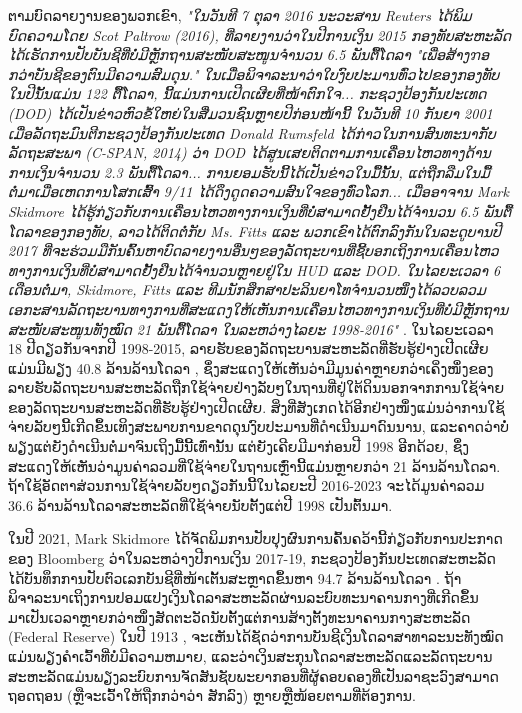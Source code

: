 \documentclass[10pt,twocolumn,letterpaper]{article}
\begin{document}
ຕາມບົດລາຍງານຂອງພວກເຂົາ, \textit{"ໃນວັນທີ 7 ຕຸລາ 2016 ນະວະສານ Reuters ໄດ້ພິມບົດຄວາມໂດຍ Scot Paltrow (2016), ທີ່ລາຍງານວ່າໃນປີການເງິນ 2015 ກອງທັບສະຫະລັດໄດ້ເຮັດການປັບບັນຊີທີ່ບໍ່ມີຫຼັກຖານສະໜັບສະໜູນຈຳນວນ 6.5 ພັນຕື້ໂດລາ "ເພື່ອສ້າງຠອກວ່າບັນຊີຂອງຕົນມີຄວາມສົມດຸນ." ໃນເມື່ອພິຈາລະນາວ່າໃບງົບປະມານທົ່ວໄປຂອງກອງທັບໃນປີນັ້ນແມ່ນ 122 ຕື້ໂດລາ, ນີ້ແມ່ນການເປີດເຜີຍທີ່ໜ້າຕົກໃຈ... ກະຊວງປ້ອງກັນປະເທດ (DOD) ໄດ້ເປັນຂ່າວຫົວຂໍ້ໃຫຍ່ໃນສື່ມວນຊົນຫຼາຍປີກ່ອນໜ້ານີ້ ໃນວັນທີ 10 ກັນຍາ 2001 ເມື່ອລັດຖະມົນຕີກະຊວງປ້ອງກັນປະເທດ Donald Rumsfeld ໄດ້ກ່າວໃນການສົນທະນາກັບລັດຖະສະພາ (C-SPAN, 2014) ວ່າ DOD ໄດ້ສູນເສຍຕິດຕາມການເຄື່ອນໄຫວທາງດ້ານການເງິນຈຳນວນ 2.3 ພັນຕື້ໂດລາ... ການຍອມຮັບນີ້ໄດ້ເປັນຂ່າວໃນມື້ນັ້ນ, ແຕ່ຖືກລືມໃນມື້ຕໍ່ມາເມື່ອເຫດການໂສກເສົ້າ 9/11 ໄດ້ດຶງດູດຄວາມສົນໃຈຂອງທົ່ວໂລກ... ເມື່ອອາຈານ Mark Skidmore ໄດ້ຮູ້ກ່ຽວກັບການເຄື່ອນໄຫວທາງການເງິນທີ່ບໍ່ສາມາດຢັ້ງຢືນໄດ້ຈຳນວນ 6.5 ພັນຕື້ໂດລາຂອງກອງທັບ, ລາວໄດ້ຕິດຕໍ່ກັບ Ms. Fitts ແລະ ພວກເຂົາໄດ້ຕົກລົງກັນໃນລະດູບານປີ 2017 ທີ່ຈະຮ່ວມມືກັນຄົ້ນຫາບົດລາຍງານອື່ນໆຂອງລັດຖະບານທີ່ຊີ້ບອກເຖິງການເຄື່ອນໄຫວທາງການເງິນທີ່ບໍ່ສາມາດຢັ້ງຢືນໄດ້ຈຳນວນຫຼາຍຢູ່ໃນ HUD ແລະ DOD. ໃນໄລຍະເວລາ 6 ເດືອນຕໍ່ມາ, Skidmore, Fitts ແລະ ທີມນັກສຶກສາປະລິນຍາໂທຈຳນວນໜຶ່ງໄດ້ລວບລວມເອກະສານລັດຖະບານທາງການທີ່ສະແດງໃຫ້ເຫັນການເຄື່ອນໄຫວທາງການເງິນທີ່ບໍ່ມີຫຼັກຖານສະໜັບສະໜູນທັງໝົດ 21 ພັນຕື້ໂດລາ ໃນລະຫວ່າງໄລຍະ 1998-2016"} \cite{12}.
ໃນໄລຍະເວລາ 18 ປີດຽວກັນຈາກປີ 1998-2015, ລາຍຮັບຂອງລັດຖະບານສະຫະລັດທີ່ຮັບຮູ້ຢ່າງເປີດເຜີຍແມ່ນມີພຽງ 40.8 ລ້ານລ້ານໂດລາ \cite{15}, ຊຶ່ງສະແດງໃຫ້ເຫັນວ່າມີມູນຄ່າຫຼາຍກວ່າເຄິ່ງໜຶ່ງຂອງລາຍຮັບລັດຖະບານສະຫະລັດຖືກໃຊ້ຈ່າຍຢ່າງລັບໆໃນຖານທີ່ຢູ່ໃຕ້ດິນນອກຈາກການໃຊ້ຈ່າຍຂອງລັດຖະບານສະຫະລັດທີ່ຮັບຮູ້ຢ່າງເປີດເຜີຍ. ສິ່ງທີ່ສັງເກດໄດ້ອີກຢ່າງໜຶ່ງແມ່ນວ່າການໃຊ້ຈ່າຍລັບໆນີ້ເກີດຂຶ້ນເທິງສະພາບການຂາດດຸນງົບປະມານທີ່ດຳເນີນມາດົນນານ, ແລະຄາດວ່າບໍ່ພຽງແຕ່ຍັງດຳເນີນຕໍ່ມາຈົນເຖິງມື້ນີ້ເທົ່ານັ້ນ ແຕ່ຍັງເຄີຍມີມາກ່ອນປີ 1998 ອີກດ້ວຍ, ຊຶ່ງສະແດງໃຫ້ເຫັນວ່າມູນຄ່າລວມທີ່ໃຊ້ຈ່າຍໃນຖານເຫຼົ່ານີ້ແມ່ນຫຼາຍກວ່າ 21 ລ້ານລ້ານໂດລາ. ຖ້າໃຊ້ອັດຕາສ່ວນການໃຊ້ຈ່າຍລັບໆດຽວກັນນີ້ໃນໄລຍະປີ 2016-2023 ຈະໄດ້ມູນຄ່າລວມ 36.6 ລ້ານລ້ານໂດລາສະຫະລັດທີ່ໃຊ້ຈ່າຍນັບຕັ້ງແຕ່ປີ 1998 ເປັນຕົ້ນມາ.

ໃນປີ 2021, Mark Skidmore ໄດ້ຈັດພິມການປັບປຸງຜົນການຄົ້ນຄວ້ານີ້ກ່ຽວກັບການປະກາດຂອງ Bloomberg ວ່າໃນລະຫວ່າງປີການເງິນ 2017-19, ກະຊວງປ້ອງກັນປະເທດສະຫະລັດໄດ້ບັນທຶກການປັບຕົວເລກບັນຊີທີ່ໜ້າເຕັ້ນສະຫຼາດຂຶ້ນຫາ 94.7 ລ້ານລ້ານໂດລາ \cite{17,18}. ຖ້າພິຈາລະນາເຖິງການປອມແປງເງິນໂດລາສະຫະລັດຜ່ານລະບົບທະນາຄານກາງທີ່ເກີດຂຶ້ນມາເປັນເວລາຫຼາຍກວ່າໜຶ່ງສັດຕະວັດນັບຕັ້ງແຕ່ການສ້າງຕັ້ງທະນາຄານກາງສະຫະລັດ (Federal Reserve) ໃນປີ 1913 \cite{37}, ຈະເຫັນໄດ້ຊັດວ່າການບັນຊີເງິນໂດລາສາທາລະນະທັງໝົດແມ່ນພຽງຄຳເວົ້າທີ່ບໍ່ມີຄວາມຫມາຍ, ແລະວ່າເງິນສະກຸນໂດລາສະຫະລັດແລະລັດຖະບານສະຫະລັດແມ່ນພຽງລະບົບການຈັດສັນຊັບພະຍາກອນທີ່ຜູ້ຄອບຄອງທີ່ເປັນລາຊະວົງສາມາດຖອດຖອນ (ຫຼືຈະເວົ້າໃຫ້ຖືກກວ່າວ່າ ສັກລົງ) ຫຼາຍຫຼືໜ້ອຍຕາມທີ່ຕ້ອງການ.
\end{document}
